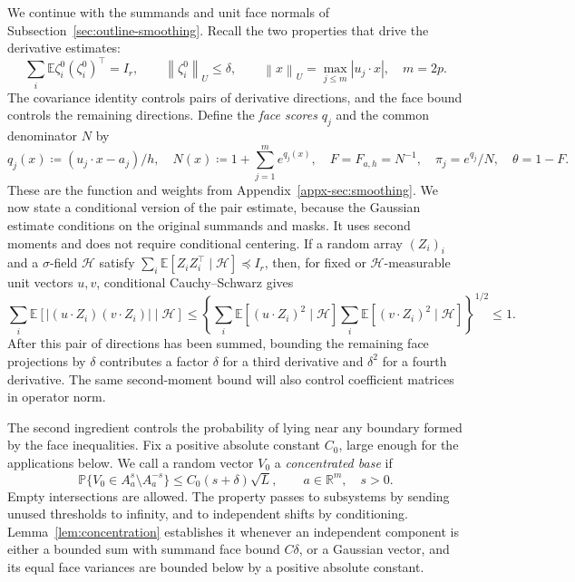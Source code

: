 \documentclass[11pt,letterpaper]{article}
\theoremstyle{remark}
\newcommand{\E}{\mathbb E}
\newcommand{\Pp}{\mathbb P}
\newcommand{\R}{\mathbb R}
\newcommand{\norm}[1]{\left\lVert#1\right\rVert}
\begin{document}
We continue with the summands and unit face normals of
Subsection~\ref{sec:outline-smoothing}. Recall the two properties
that drive the derivative estimates:
\begin{equation}
 \sum_i\E\zeta_i^0(\zeta_i^0)^\top=I_r,
 \qquad \norm{\zeta_i^0}_U\le\delta,
 \qquad \norm x_U=\max_{j\le m}|u_j\cdot x|,
 \quad m=2p.
 \label{appx-eq:projected-bound}
\end{equation}
The covariance identity controls pairs of derivative directions,
and the face bound controls the remaining directions. Define the
\emph{face scores} \(q_j\) and the common denominator \(N\) by
\begin{equation}
 \label{appx-an:basic-notation}
 q_j(x)\coloneqq(u_j\cdot x-a_j)/h,\quad
 N(x)\coloneqq1+\sum_{j=1}^m e^{q_j(x)},\quad
 F=F_{a,h}=N^{-1},\quad\pi_j=e^{q_j}/N,\quad\theta=1-F.
\end{equation}
These are the function and weights from Appendix~\ref{appx-sec:smoothing}.
We now state a conditional version of the pair estimate, because
the Gaussian estimate conditions on the original summands and masks.
It uses second moments and does not require conditional centering. If a random array \((Z_i)_i\)
and a \(\sigma\)-field \(\mathcal H\) satisfy
\(\sum_i\E[Z_iZ_i^\top\mid\mathcal H]\preceq I_r\), then, for
fixed or \(\mathcal H\)-measurable unit vectors \(u,v\),
conditional Cauchy--Schwarz gives
\begin{equation}
 \sum_i\E[|(u\cdot Z_i)(v\cdot Z_i)|\mid\mathcal H]
 \le\left\{\sum_i\E[(u\cdot Z_i)^2\mid\mathcal H]
           \sum_i\E[(v\cdot Z_i)^2\mid\mathcal H]\right\}^{1/2}
 \le1.
 \label{appx-an:pair-contraction}
\end{equation}
After this pair of directions has been summed, bounding the remaining
face projections by \(\delta\) contributes a factor \(\delta\)
for a third derivative and \(\delta^2\) for a fourth derivative.
The same second-moment bound will also control coefficient matrices
in operator norm.

The second ingredient controls the probability of lying near any
boundary formed by the face inequalities. Fix a positive absolute
constant \(C_0\), large enough for the applications below. We call
a random vector \(V_0\) a \emph{concentrated base} if
\begin{equation}
 \Pp\{V_0\in A_a^s\setminus A_a^{-s}\}
 \le C_0(s+\delta)\sqrt L,
 \qquad a\in\R^m,\quad s>0.
 \label{appx-an:concentration}
\end{equation}
Empty intersections are allowed. The property passes to subsystems
by sending unused thresholds to infinity, and to independent shifts
by conditioning. Lemma~\ref{lem:concentration} establishes it whenever an independent component is
either a bounded sum with summand face bound \(C\delta\), or a
Gaussian vector, and its equal face variances are bounded below by
a positive absolute constant.
\end{document}
